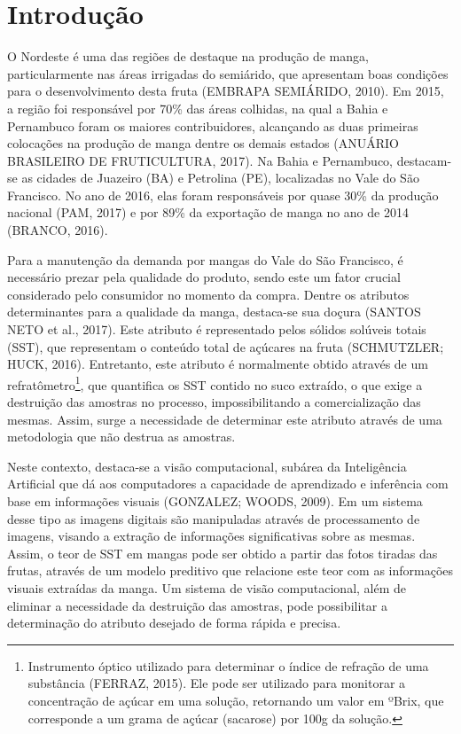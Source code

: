 \chapter{Introdução}

O Nordeste é uma das regiões de destaque na produção de manga, particularmente nas áreas irrigadas do semiárido, que apresentam boas condições para o desenvolvimento desta fruta (EMBRAPA SEMIÁRIDO, 2010). Em 2015, a região foi responsável por 70\% das áreas colhidas, na qual a Bahia e Pernambuco foram os maiores contribuidores, alcançando as duas primeiras colocações na produção de manga dentre os demais estados (ANUÁRIO BRASILEIRO DE FRUTICULTURA, 2017). Na Bahia e Pernambuco, destacam-se as cidades de Juazeiro (BA) e Petrolina (PE), localizadas no Vale do São Francisco. No ano de 2016, elas foram responsáveis por quase 30\% da produção nacional (PAM, 2017) e por 89\% da exportação de manga no ano de 2014 (BRANCO, 2016).

Para a manutenção da demanda por mangas do Vale do São Francisco, é necessário prezar pela qualidade do produto, sendo este um fator crucial considerado pelo consumidor no momento da compra. Dentre os atributos determinantes para a qualidade da manga, destaca-se sua doçura (SANTOS NETO et al., 2017). Este atributo é representado pelos sólidos solúveis totais (SST), que representam o conteúdo total de açúcares na fruta (SCHMUTZLER; HUCK, 2016). Entretanto, este atributo é normalmente obtido através de um refratômetro\footnote{\label{ftnote:refratometer}Instrumento óptico utilizado para determinar o índice de refração de uma substância (FERRAZ, 2015). Ele pode ser utilizado para monitorar a concentração de açúcar em uma solução, retornando um valor em ºBrix, que corresponde a um grama de açúcar (sacarose) por 100g da solução.}, que quantifica os SST contido no suco extraído, o que exige a destruição das amostras no processo, impossibilitando a comercialização das mesmas. Assim, surge a necessidade de determinar este atributo através de uma metodologia que não destrua as amostras.

Neste contexto, destaca-se a visão computacional, subárea da Inteligência Artificial que dá aos computadores a capacidade de aprendizado e inferência com base em informações visuais (GONZALEZ; WOODS, 2009). Em um sistema desse tipo as imagens digitais são manipuladas através de processamento de imagens, visando a extração de informações significativas sobre as mesmas. Assim, o teor de SST em mangas pode ser obtido a partir das fotos tiradas das frutas, através de um modelo preditivo que relacione este teor com as informações visuais extraídas da manga. Um sistema de visão computacional, além de eliminar a necessidade da destruição das amostras, pode possibilitar a determinação do atributo desejado de forma rápida e precisa.

